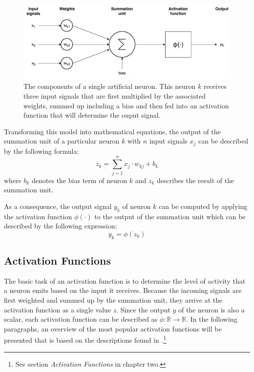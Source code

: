\begin{figure}[h]
  \centering
  \includegraphics[width=\textwidth]{../figures/single_neuron}
  \caption{The components of a single artificial neuron. This neuron
    \(k\) receives three input signals that are first multiplied by
    the associated weights, summed up including a bias and then fed
    into an activation function that will determine the ouput signal.}
  \label{fig:single-neuron}
\end{figure}
Transforming this model into mathematical equations, the output of the
summation unit of a particular
neuron \(k\) with \(n\) input signals \(x_j\) can be described by the
following formula:
\begin{equation}
  \label{eq:input}
  z_k = \sum_{j=1}^{n}{x_j \cdot w_{kj}} + b_k
\end{equation}
where \(b_k\) denotes the bias term of neuron \(k\) and \(z_k\) describes the
result of the summation unit.

As a consequence, the output signal \(y_k\) of neuron \(k\) can be computed by
applying the activation function \(\phi(\cdot)\) to the output of the
summation unit which can be described by the following expression:
\begin{equation}
  y_k = \phi(z_k)
\end{equation}

\subsection{Activation Functions}
\label{sec:activation-functions}
The basic task of an activation function is to determine the level of
activity that a neuron emits based on the input it receives. Because the
incoming signals are first weighted and summed up by the summation unit, they
arrive at the activation function as a single value \(z\). Since the
output \(y\)
of the neuron is also a scalar, each activation function can be
described as \(\phi: \mathbb{R} \rightarrow \mathbb{R}\). In the
following paragraphs, an overview of the most popular activation
functions will be presented that is based on the descriptions found in
\cite{Patterson}.\footnote{See section \textit{Activation Functions}
  in chapter two.}

